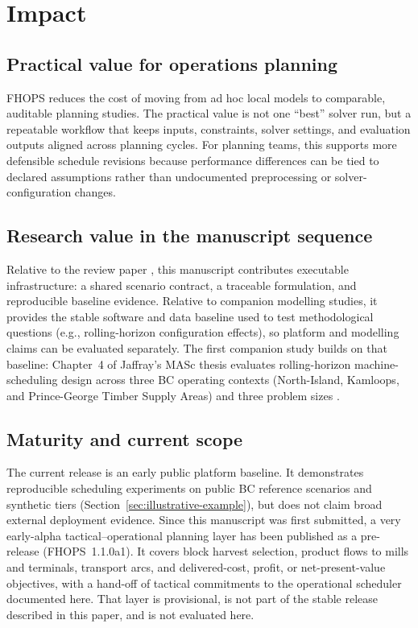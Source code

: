 \section{Impact}
\label{sec:impact}

\subsection{Practical value for operations planning}
FHOPS reduces the cost of moving from ad hoc local models to comparable, auditable planning studies. The practical value is not one ``best'' solver run, but a repeatable workflow that keeps inputs, constraints, solver settings, and evaluation outputs aligned across planning cycles.
For planning teams, this supports more defensible schedule revisions because performance differences can be tied to declared assumptions rather than undocumented preprocessing or solver-configuration changes.

\subsection{Research value in the manuscript sequence}
Relative to the review paper \cite{jaffray2026systematic}, this manuscript contributes executable infrastructure: a shared scenario contract, a traceable formulation, and reproducible baseline evidence. Relative to companion modelling studies, it provides the stable software and data baseline used to test methodological questions (e.g., rolling-horizon configuration effects), so platform and modelling claims can be evaluated separately. The first companion study builds on that baseline: Chapter~4 of Jaffray's MASc thesis evaluates rolling-horizon machine-scheduling design across three BC operating contexts (North-Island, Kamloops, and Prince-George Timber Supply Areas) and three problem sizes \cite{jaffray2026thesis}.

\subsection{Maturity and current scope}
The current release is an early public platform baseline. It demonstrates reproducible scheduling experiments on public BC reference scenarios and synthetic tiers (Section~\ref{sec:illustrative-example}), but does not claim broad external deployment evidence. Since this manuscript was first submitted, a very early-alpha tactical--operational planning layer has been published as a pre-release (FHOPS~1.1.0a1). It covers block harvest selection, product flows to mills and terminals, transport arcs, and delivered-cost, profit, or net-present-value objectives, with a hand-off of tactical commitments to the operational scheduler documented here. That layer is provisional, is not part of the stable release described in this paper, and is not evaluated here.

